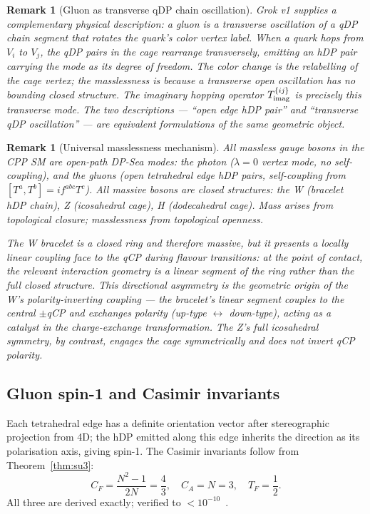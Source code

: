 \documentclass[11pt,a4paper]{article}
\newtheorem{remark}[theorem]{Remark}
\begin{document}
\begin{remark}[Gluon as transverse qDP chain oscillation]
\label{rem:gluon_transverse}
Grok v1 supplies a complementary physical description: a gluon is
a \emph{transverse oscillation of a qDP chain segment that rotates
the quark's color vertex label}.  When a quark hops from $V_i$ to
$V_j$, the qDP pairs in the cage rearrange transversely, emitting
an hDP pair carrying the mode as its degree of freedom.  The color
change is the relabelling of the cage vertex; the masslessness is
because a transverse open oscillation has no bounding closed
structure.  The imaginary hopping operator $T^{\{ij\}}_{\rm imag}$
is precisely this transverse mode.  The two descriptions --- ``open
edge hDP pair'' and ``transverse qDP oscillation'' --- are
equivalent formulations of the same geometric object.
\end{remark}

\begin{remark}[Universal masslessness mechanism]
All massless gauge bosons in the CPP SM are open-path DP-Sea modes:
the photon ($\lambda=0$ vertex mode, no self-coupling), and the
gluons (open tetrahedral edge hDP pairs, self-coupling from
$[T^a,T^b]=if^{abc}T^c$).  All massive bosons are closed structures:
the W (bracelet hDP chain), Z (icosahedral cage), H (dodecahedral
cage).  Mass arises from topological closure; masslessness from
topological openness.

The W bracelet is a closed ring and therefore massive, but it
presents a \emph{locally linear coupling face} to the qCP during
flavour transitions: at the point of contact, the relevant
interaction geometry is a linear segment of the ring rather than
the full closed structure.  This directional asymmetry is the
geometric origin of the W's polarity-inverting coupling ---
the bracelet's linear segment couples to the central $\pm$qCP and
exchanges polarity (up-type $\leftrightarrow$ down-type),
acting as a catalyst in the charge-exchange transformation.
The Z's full icosahedral symmetry, by contrast, engages the cage
symmetrically and does not invert qCP polarity.
\end{remark}

\subsection{Gluon spin-1 and Casimir invariants}

Each tetrahedral edge has a definite orientation vector after
stereographic projection from 4D; the hDP emitted along this edge
inherits the direction as its polarisation axis, giving spin-1.
The Casimir invariants follow from Theorem~\ref{thm:su3}:
\begin{equation}
C_F = \frac{N^2-1}{2N} = \frac{4}{3},\quad
C_A = N = 3,\quad
T_F = \frac{1}{2}.
\label{eq:casimirs}
\end{equation}
All three are derived exactly; verified to $<10^{-10}$~\citep{cpp_ss_mc}.
\end{document}
